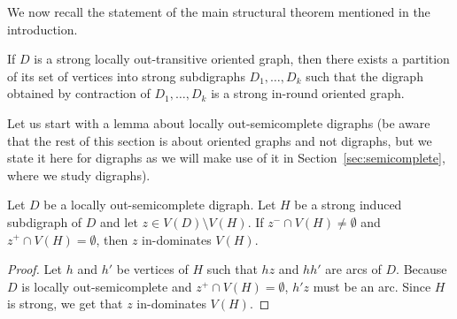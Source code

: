 We now recall the statement of the main structural theorem mentioned in the introduction.

\begin{theorem}\label{thm:struct}
If $D$ is a strong locally out-transitive oriented graph, then there exists a partition of its set of vertices into strong subdigraphs $D_{1},\ldots,D_{k}$ such that the digraph obtained by contraction of $D_{1},\ldots,D_{k}$ is a strong in-round oriented graph.
\end{theorem}


Let us start with a lemma about locally out-semicomplete digraphs (be aware that the rest of this section is about oriented graphs and not digraphs, but we state it here for digraphs as we will make use of it in Section~\ref{sec:semicomplete}, where we study digraphs).

\begin{lemma}\label{lem:base}
Let $D$ be a locally out-semicomplete digraph. Let $H$ be a strong induced subdigraph of $D$ and let $z\in V(D) \setminus V(H)$. If $z^-\cap V(H) \neq \emptyset$ and $z^+\cap V(H) = \emptyset$, then $z$ in-dominates $V(H)$.
\end{lemma}
\begin{proof}
Let $h$ and $h'$ be vertices of $H$ such that $hz$ and $hh'$ are arcs of $D$. Because $D$ is locally out-semicomplete and $z^+\cap V(H) = \emptyset$, $h'z$ must be an arc. Since $H$ is strong, we get that $z$ in-dominates $V(H)$.
\end{proof}

